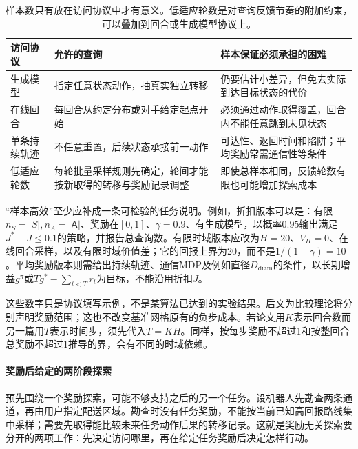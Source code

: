 \begin{table}[t]
  \centering
  \small
  \begin{tabularx}{\linewidth}{>{\raggedright\arraybackslash}p{25mm} >{\raggedright\arraybackslash}X >{\raggedright\arraybackslash}X}
    \toprule
    访问协议 & 允许的查询 & 样本保证必须承担的困难 \\
    \midrule
    生成模型 & 指定任意状态动作，抽真实独立转移 & 仍要估计小差异，但免去实际到达目标状态的代价 \\
    在线回合 & 每回合从约定分布或对手给定起点开始 & 必须通过动作取得覆盖，回合内不能任意跳到未见状态 \\
    单条持续轨迹 & 不任意重置，后续状态承接前一动作 & 可达性、返回时间和陷阱；平均奖励常需通信性等条件 \\
    低适应轮数 & 每轮批量采样规则先确定，轮间才能按新取得的转移与奖励记录调整 & 即使总样本相同，反馈轮数有限也可能增加探索成本 \\
    \bottomrule
  \end{tabularx}
  \caption{样本数只有放在访问协议中才有意义。低适应轮数是对查询反馈节奏的附加约束，可以叠加到回合或生成模型协议上。}
  \label{tab:rl-learning-access-models}
\end{table}

“样本高效”至少应补成一条可检验的任务说明。例如，折扣版本可以是：有限$n_S=|S|,n_A=|\mathsf A|$、奖励在$[0,1]$、$\gamma=0.9$、有生成模型，以概率$0.95$输出满足$J^*-J\leq0.1$的策略，并报告总查询数。有限时域版本应改为$H=20$、$V_H=0$、在线回合采样，以及有限时域价值差；它的回报上界为20，而不是$1/(1-\gamma)=10$。平均奖励版本则需给出持续轨迹、通信MDP及例如直径$D_{\mathrm{diam}}$的条件，以长期增益$g^\pi$或$Tg^*-\sum_{t<T}r_t$为目标，不能沿用折扣$J$。

这些数字只是协议填写示例，不是某算法已达到的实验结果。后文为比较理论将分别声明奖励范围；这也不改变基准网格原有的负步成本。若论文用$K$表示回合数而另一篇用$T$表示时间步，须先代入$T=KH$。同样，按每步奖励不超过1和按整回合总奖励不超过1推导的界，会有不同的时域依赖。

\paragraph{奖励后给定的两阶段探索}
\label{sec:rl-learning-reward-free}
预先围绕一个奖励探索，可能不够支持之后的另一个任务。设机器人先勘查两条通道，再由用户指定配送区域。勘查时没有任务奖励，不能按当前已知高回报路线集中采样；需要先取得能比较未来任务动作后果的转移记录。这就是奖励无关探索要分开的两项工作：先决定访问哪里，再在给定任务奖励后决定怎样行动。

